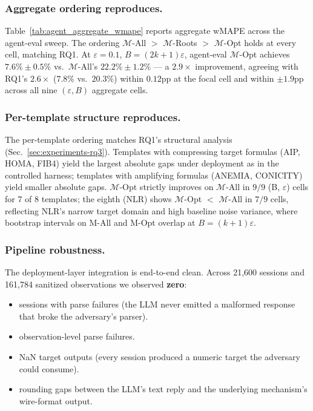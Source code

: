 \subsubsection{Aggregate ordering reproduces.}
Table~\ref{tab:agent_aggregate_wmape} reports aggregate wMAPE across the agent-eval sweep. The ordering $\mathcal{M}$-All $>$ $\mathcal{M}$-Roots $>$ $\mathcal{M}$-Opt holds at every cell, matching RQ1. At $\varepsilon = 0.1$, $B = (2k{+}1)\varepsilon$, agent-eval $\mathcal{M}$-Opt achieves $7.6\% \pm 0.5\%$ vs.\ $\mathcal{M}$-All's $22.2\% \pm 1.2\%$ --- a $2.9\times$ improvement, agreeing with RQ1's $2.6\times$ ($7.8\%$ vs.\ $20.3\%$) within $0.12$pp at the focal cell and within $\pm 1.9$pp across all nine $(\varepsilon, B)$ aggregate cells.


\subsubsection{Per-template structure reproduces.}
The per-template ordering matches RQ1's structural analysis (Sec.~\ref{sec:experiments-rq3}). Templates with compressing target formulas (AIP, HOMA, FIB4) yield the largest absolute gaps under deployment as in the controlled harness; templates with amplifying formulas (ANEMIA, CONICITY) yield smaller absolute gaps. $\mathcal{M}$-Opt strictly improves on $\mathcal{M}$-All in $9/9$ (B, $\varepsilon$) cells for 7 of 8 templates; the eighth (NLR) shows $\mathcal{M}$-Opt $<$ $\mathcal{M}$-All in $7/9$ cells, reflecting NLR's narrow target domain and high baseline noise variance, where bootstrap intervals on M-All and M-Opt overlap at $B = (k{+}1)\varepsilon$.

\subsubsection{Pipeline robustness.}
The deployment-layer integration is end-to-end clean. Across 21{,}600 sessions and 161{,}784 sanitized observations we observed \textbf{zero}:
\begin{itemize}
    \item sessions with parse failures (the LLM never emitted a malformed response that broke the adversary's parser).
    \item observation-level parse failures.
    \item NaN target outputs (every session produced a numeric target the adversary could consume).
    \item rounding gaps between the LLM's text reply and the underlying mechanism's wire-format output.
\end{itemize}

